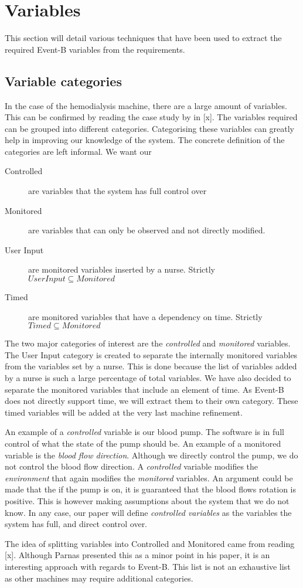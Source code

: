 \section{Variables}
This section will detail various techniques that have been used to extract the required Event-B variables from the requirements.

\subsection{Variable categories}
In the case of the hemodialysis machine, there are a large amount of variables. This can be confirmed by reading the case study by in [x]. The variables required can be grouped into different categories. Categorising these variables can greatly help in improving our knowledge of the system. The concrete definition of the categories are left informal. We want our 
\begin{description}
\item [Controlled] are variables that the system has full control over
\item [Monitored] are variables that can only be observed and not directly modified.
\item [User Input] are monitored variables inserted by a nurse. Strictly $User Input \subseteq Monitored$
\item [Timed] are monitored variables that have a dependency on time. Strictly $Timed \subseteq Monitored$
\end{description}
The two major categories of interest are the \textit{controlled} and \textit{monitored} variables. The User Input category is created to separate the internally monitored variables from the variables set by a nurse. This is done because the list of variables added by a nurse is such a large percentage of total variables. We have also decided to separate the monitored variables that include an element of time. As Event-B does not directly support time, we will extract them to their own category. These timed variables will be added at the very last machine refinement. 

An example of a \textit{controlled} variable is our blood pump. The software is in full control of what the state of the pump should be. An example of a monitored variable is the \textit{blood flow direction}. Although we directly control the pump, we do not control the blood flow direction. A \textit{controlled} variable modifies the \textit{environment} that again modifies the \textit{monitored} variables. An argument could be made that the if the pump is on, it is guaranteed that the blood flows rotation is positive. This is however making assumptions about the system that we do not know. In any case, our paper will define \textit{controlled variables} as the variables the system has full, and direct control over.

The idea of splitting variables into Controlled and Monitored came from reading [x]. Although Parnas presented this as a minor point in his paper, it is an interesting approach with regards to Event-B.
This list is not an exhaustive list as other machines may require additional categories.
